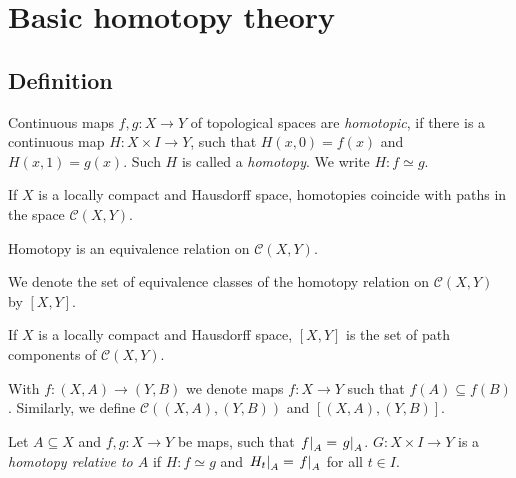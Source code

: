 \section{Basic homotopy theory}

\subsection{Definition}


\begin{definicija}
Continuous maps $f, g \colon X \to Y$ of topological spaces are
\emph{homotopic}, if there is a continuous map
$H \colon X \times I \to Y$, such that $H(x, 0) = f(x)$ and
$H(x, 1) = g(x)$. Such $H$ is called a
\emph{homotopy}. We write $H \colon f \simeq g$.
\end{definicija}

\begin{opomba}
If $X$ is a locally compact and Hausdorff space, homotopies
coincide with paths in the space $\mathcal{C}(X, Y)$.
\end{opomba}

\begin{trditev}
Homotopy is an equivalence relation on $\mathcal{C}(X, Y)$.
\end{trditev}

\obvs

\begin{definicija}
We denote the set of equivalence classes of the homotopy relation
on $\mathcal{C}(X, Y)$ by $[X, Y]$.
\end{definicija}

\begin{opomba}
If $X$ is a locally compact and Hausdorff space, $[X, Y]$ is the
set of path components of $\mathcal{C}(X, Y)$.
\end{opomba}

\begin{definicija}
With $f \colon (X, A) \to (Y, B)$ we denote maps $f \colon X \to Y$
such that $f(A) \subseteq f(B)$. Similarly, we define
$\mathcal{C}( (X, A), (Y, B))$ and $[(X,A), (Y,B)]$.
\end{definicija}

\begin{definicija}
Let $A \subseteq X$ and $f, g \colon X \to Y$ be maps, such that
$\left. f\right|_{A}^{} = \left. g\right|_{A}^{}$. $G \colon X \times I \to Y$ is a
\emph{homotopy relative to $A$}
if $H \colon f \simeq g$ and $\left. H_t\right|_{A}^{} = \left. f\right|_{A}^{}$ for
all $t \in I$.
\end{definicija}

